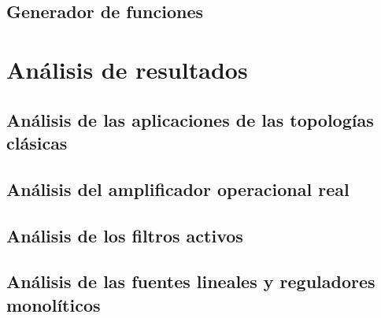 \documentclass{article}
\begin{document}
\subsection{Generador de funciones}

\FloatBarrier

\section{Análisis de resultados}
\subsection{Análisis de las aplicaciones de las topologías clásicas}

\FloatBarrier
\subsection{Análisis del amplificador operacional real}

\FloatBarrier
\subsection{Análisis de los filtros activos}

\FloatBarrier
\subsection{Análisis de las fuentes lineales y reguladores monolíticos}
\FloatBarrier


\FloatBarrier
% 
\printbibliography[heading=bibintoc, title={Bibliografía}]
\end{document}
